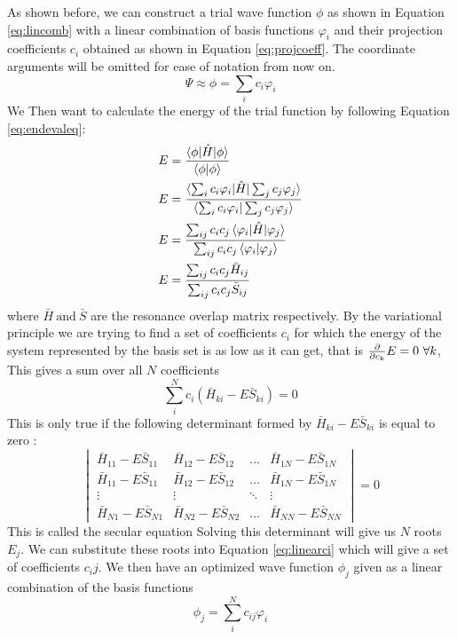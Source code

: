 \documentclass[../master_thesis.tex]{subfiles}
\begin{document}
As shown before, we can construct a trial wave function $\phi$ as shown in Equation
\ref{eq:lincomb} with a linear combination of basis functions $\varphi_i$ and
their projection coefficients $c_i$ obtained as shown in Equation \ref{eq:projcoeff}.
The coordinate arguments will be omitted for ease of notation from now on.
\begin{equation}
  \Psi \approx \phi = \sum_i c_i \varphi_i
\end{equation}
 We Then want to calculate the energy of the trial function by following Equation
 \ref{eq:endevaleq}\cite{Cramer:2004}:
 \begin{align}
   \begin{split}
     E &= \frac{\braket{\phi|\hat{H}|\phi}}{\braket{\phi|\phi}} \\
     E &= \frac{\braket{\sum_i c_i \varphi_i|\hat{H}|\sum_j c_j \varphi_j}}{\braket{\sum_i c_i \varphi_i|\sum_j c_j \varphi_j}} \\
     E &= \frac{\sum_{ij} c_i c_j \braket{\varphi_i|\hat{H}|\varphi_j}}{\sum_{ij}c_i c_j\braket{\varphi_i|\varphi_j}}\\
     E &= \frac{\sum_{ij} c_i c_j\bar{H}_{ij}}{\sum_{ij} c_i c_j\bar{S}_{ij}}
   \end{split}
 \end{align}
where $\bar{H}\ \text{and} \ \bar{S}$ are the resonance overlap matrix respectively.
By the variational principle we are trying to find a set of coefficients $c_i$
for which the energy of the system represented by the basis set is as low as it
can get, that is $\diff{c_k}E = 0 \ \forall k $, This gives a sum over all $N$
coefficients \cite{Cramer:2004}
\begin{equation}\label{eq:linearci}
  \sum_{i}^N c_i (\bar{H}_{ki} - E\bar{S}_{ki}) = 0
\end{equation}
This is only true if the following determinant formed by $\bar{H}_{ki} - E\bar{S}_{ki}$
is equal to zero \cite{Cramer:2004}:
\begin{equation}\label{eq:seceq}
  \begin{vmatrix}
    \bar{H}_{11} - E\bar{S}_{11} & \bar{H}_{12} - E\bar{S}_{12} & \ldots & \bar{H}_{1N} - E\bar{S}_{1N} \\
    \bar{H}_{11} - E\bar{S}_{11} & \bar{H}_{12} - E\bar{S}_{12} & \ldots & \bar{H}_{1N} - E\bar{S}_{1N} \\
    \vdots & \vdots & \ddots & \vdots\\
    \bar{H}_{N1} - E\bar{S}_{N1} & \bar{H}_{N2} - E\bar{S}_{N2} & \ldots & \bar{H}_{NN} - E\bar{S}_{NN}
  \end{vmatrix} = 0
\end{equation}
This is called the secular equation \cite{Cramer:2004} Solving this determinant
will give us $N$ roots $E_j$. We can substitute these roots into Equation
\ref{eq:linearci} which will give a set of coefficients $c_ij$. We then have an
optimized wave function $\phi_j$ given as a linear combination of the basis functions
\begin{equation}
  \phi_j = \sum_{i}^N c_{ij}\varphi_i
\end{equation}
\end{document}

